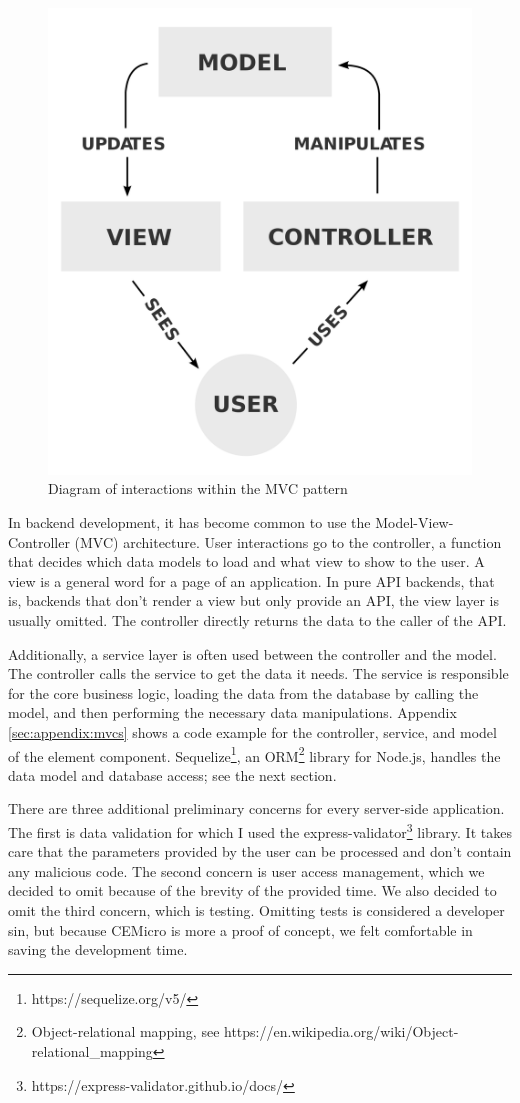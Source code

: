 \begin{figure}[ht]
  \centering
  \includegraphics[width=0.3\linewidth]{assets/mvc-process.png}
  \caption{Diagram of interactions within the MVC pattern}
  \label{fig:mvc-process}
\end{figure}

In backend development, it has become common to use the Model-View-Controller (MVC) architecture. User interactions go to the controller, a function that decides which data models to load and what view to show to the user. A view is a general word for a page of an application. In pure API backends, that is, backends that don't render a view but only provide an API, the view layer is usually omitted. The controller directly returns the data to the caller of the API.

Additionally, a service layer is often used between the controller and the model. The controller calls the service to get the data it needs. The service is responsible for the core business logic, loading the data from the database by calling the model, and then performing the necessary data manipulations. Appendix \ref{sec:appendix:mvcs} shows a code example for the controller, service, and model of the element component. Sequelize\footnote{https://sequelize.org/v5/}, an ORM\footnote{Object-relational mapping, see https://en.wikipedia.org/wiki/Object-relational_mapping} library for Node.js, handles the data model and database access; see the next section.

There are three additional preliminary concerns for every server-side application. The first is data validation for which I used the express-validator\footnote{https://express-validator.github.io/docs/} library. It takes care that the parameters provided by the user can be processed and don't contain any malicious code. The second concern is user access management, which we decided to omit because of the brevity of the provided time. We also decided to omit the third concern, which is testing. Omitting tests is considered a developer sin, but because CEMicro is more a proof of concept, we felt comfortable in saving the development time.

